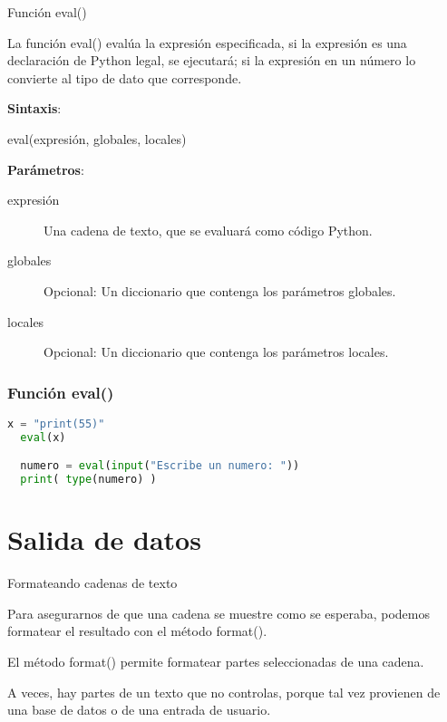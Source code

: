 \begin{frame}[c]{Función eval()}

  La función \textcolor{codeKeyword2}{eval}() evalúa la expresión
  especificada, si la expresión es una declaración de Python legal,
  se ejecutará; si la expresión en un número lo convierte al tipo de
  dato que corresponde.

  \vspace{\baselineskip}
  \textbf{Sintaxis}:

  \vspace{\baselineskip}
  \textcolor{codeKeyword2}{eval}(expresión, globales, locales)

  \vspace{\baselineskip}
  \textbf{Parámetros}:
  \begin{description}
    \item[expresión] Una cadena de texto, que se evaluará como código
      Python.
    \item[globales] Opcional: Un diccionario que contenga los parámetros
      globales.
    \item[locales] Opcional: Un diccionario que contenga los parámetros
      locales.
  \end{description}
\end{frame}

\begin{frame}[fragile]
  \frametitle{Función eval()}

  \begin{lstlisting}[language=Python]
  x = "print(55)"
  eval(x)

  numero = eval(input("Escribe un numero: "))
  print( type(numero) )
  \end{lstlisting}
\end{frame}

\section{Salida de datos}

\begin{frame}[c]{Formateando cadenas de texto}

  Para asegurarnos de que una cadena se muestre como se esperaba,
  podemos formatear el resultado con el método
  \textcolor{codeKeyword2}{format}().

  \vspace{\baselineskip}
  El método \textcolor{codeKeyword2}{format}() permite formatear
  partes seleccionadas de una cadena.

  \vspace{\baselineskip}
  A veces, hay partes de un texto que no controlas, porque tal vez provienen
  de una base de datos o de una entrada de usuario.

\end{frame}


